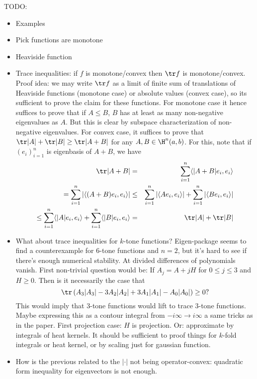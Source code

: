 TODO:
\begin{itemize}
	\item Examples
	\item Pick functions are monotone
	\item Heaviside function
	\item Trace inequalities: if $f$ is monotone/convex then $\tr f$ is monotone/convex. Proof idea: we may write $\tr f$ as a limit of finite sum of translations of Heaviside functions (monotone case) or absolute values (convex case), so its sufficient to prove the claim for these functions. For monotone case it hence suffices to prove that if $A \leq B$, $B$ has at least as many non-negative eigenvalues as $A$. But this is clear by subspace characterization of non-negative eigenvalues. For convex case, it suffices to prove that $\tr |A| + \tr |B| \geq \tr |A + B|$ for any $A, B \in \H^{n}(a, b)$. For this, note that if $(e_{i})_{i = 1}^{n}$ is eigenbasis of $A + B$, we have
	\begin{eqnarray*}
		\tr |A + B| &=& \sum_{i = 1}^{n} \langle |A + B| e_{i}, e_{i} \rangle \\
		= \sum_{i = 1}^{n} \left|\langle (A + B) e_{i}, e_{i} \rangle \right| &\leq& \sum_{i = 1}^{n} \left|\langle A e_{i}, e_{i} \rangle \right| + \sum_{i = 1}^{n} \left|\langle B e_{i}, e_{i} \rangle \right| \\
		\leq \sum_{i = 1}^{n} \langle |A| e_{i}, e_{i} \rangle + \sum_{i = 1}^{n} \langle |B| e_{i}, e_{i} \rangle &=& \tr |A| + \tr |B|
	\end{eqnarray*}
	\item What about trace inequalities for $k$-tone functions? Eigen-package seems to find a counterexample for $6$-tone functions and $n = 2$, but it's hard to see if there's enough numerical stability. At divided differences of polynomials vanish. First non-trivial question would be:
	If $A_{j} = A + j H$ for $0 \leq j \leq 3$ and $H \geq 0$. Then is it necessarily the case that
	\[
		\tr \left(A_{3} |A_{3}| - 3 A_{2}|A_{2}| + 3 A_{1} |A_{1}| - A_{0} |A_{0}| \right) \geq 0?
	\]
	This would imply that $3$-tone functions would lift to trace $3$-tone functions. Maybe expressing this as a contour integral from $-i \infty \to i \infty$ a same tricks as in the paper. First projection case: $H$ is projection. Or: approximate by integrals of heat kernels. It should be sufficient to proof things for $k$-fold integrals or heat kernel, or by scaling just for gaussian function.
	\item How is the previous related to the $|\cdot|$ not being operator-convex: quadratic form inequality for eigenvectors is not enough.

\end{itemize}
